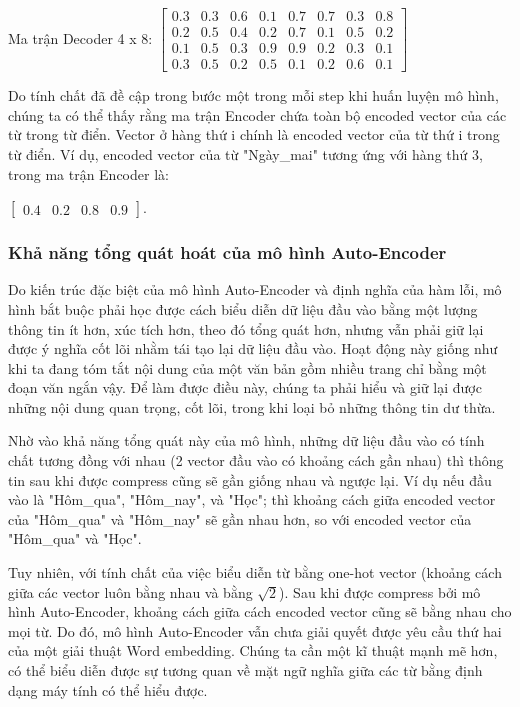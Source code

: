 Ma trận Decoder 4 x 8:
$\begin{bmatrix}
 0.3 & 0.3 & 0.6 & 0.1 & 0.7 & 0.7 & 0.3 & 0.8 \\
 0.2 & 0.5 & 0.4 & 0.2 & 0.7 & 0.1 & 0.5 & 0.2 \\
 0.1 & 0.5 & 0.3 & 0.9 & 0.9 & 0.2 & 0.3 & 0.1 \\
 0.3 & 0.5 & 0.2 & 0.5 & 0.1 & 0.2 & 0.6 & 0.1
\end{bmatrix}$

Do tính chất đã đề cập trong bước một trong mỗi step khi huấn luyện mô hình, chúng ta có thể thấy rằng ma trận Encoder chứa toàn bộ encoded vector của các từ trong từ điển. Vector ở hàng thứ i chính là encoded vector của từ thứ i trong từ điển. Ví dụ, encoded vector của từ "Ngày\_mai" tương ứng với hàng thứ 3, trong ma trận Encoder là: 

$\begin{bmatrix}
0.4 & 0.2 & 0.8 & 0.9
\end{bmatrix}$.

\subsubsection{Khả năng tổng quát hoát của mô hình Auto-Encoder}

Do kiến trúc đặc biệt của mô hình Auto-Encoder và định nghĩa của hàm lỗi, mô hình bắt buộc phải học được cách biểu diễn dữ liệu đầu vào bằng một lượng thông tin ít hơn, xúc tích hơn, theo đó tổng quát hơn, nhưng vẫn phải giữ lại được ý nghĩa cốt lõi nhằm tái tạo lại dữ liệu đầu vào. Hoạt động này giống như khi ta đang tóm tắt nội dung của một văn bản gồm nhiều trang chỉ bằng một đoạn văn ngắn vậy. Để làm được điều này, chúng ta phải hiểu và giữ lại được những nội dung quan trọng, cốt lõi, trong khi loại bỏ những thông tin dư thừa. 

Nhờ vào khả năng tổng quát này của mô hình, những dữ liệu đầu vào có tính chất tương đồng với nhau (2 vector đầu vào có khoảng cách gần nhau) thì thông tin sau khi được compress cũng sẽ gần giống nhau và ngược lại. Ví dụ nếu đầu vào là "Hôm\_qua", "Hôm\_nay", và "Học"; thì khoảng cách giữa encoded vector của "Hôm\_qua" và "Hôm\_nay" sẽ gần nhau hơn, so với encoded vector của "Hôm\_qua" và "Học".

Tuy nhiên, với tính chất của việc biểu diễn từ bằng one-hot vector (khoảng cách giữa các vector luôn bằng nhau và bằng $\sqrt{2} $). Sau khi được compress bởi mô hình Auto-Encoder, khoảng cách giữa cách encoded vector cũng sẽ bằng nhau cho mọi từ. Do đó, mô hình Auto-Encoder vẫn chưa giải quyết được yêu cầu thứ hai của một giải thuật Word embedding. Chúng ta cần một kĩ thuật mạnh mẽ hơn, có thể biểu diễn được sự tương quan về mặt ngữ nghĩa giữa các từ bằng định dạng máy tính có thể hiểu được.

